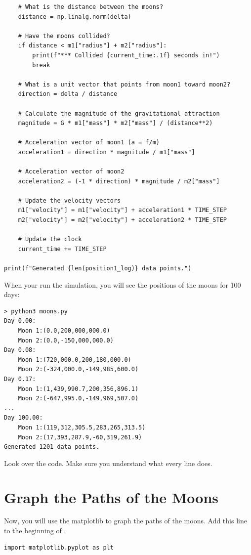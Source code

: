 \begin{verbatim}
    # What is the distance between the moons?
    distance = np.linalg.norm(delta)

    # Have the moons collided?
    if distance < m1["radius"] + m2["radius"]:
        print(f"*** Collided {current_time:.1f} seconds in!")
        break

    # What is a unit vector that points from moon1 toward moon2?
    direction = delta / distance

    # Calculate the magnitude of the gravitational attraction
    magnitude = G * m1["mass"] * m2["mass"] / (distance**2)

    # Acceleration vector of moon1 (a = f/m)
    acceleration1 = direction * magnitude / m1["mass"]

    # Acceleration vector of moon2
    acceleration2 = (-1 * direction) * magnitude / m2["mass"]

    # Update the velocity vectors
    m1["velocity"] = m1["velocity"] + acceleration1 * TIME_STEP
    m2["velocity"] = m2["velocity"] + acceleration2 * TIME_STEP

    # Update the clock
    current_time += TIME_STEP

print(f"Generated {len(position1_log)} data points.")
\end{verbatim}

When your run the simulation,  you will see the positions of the moons for 100 days:
\begin{verbatim}
> python3 moons.py 
Day 0.00:
	Moon 1:(0.0,200,000,000.0)
	Moon 2:(0.0,-150,000,000.0)
Day 0.08:
	Moon 1:(720,000.0,200,180,000.0)
	Moon 2:(-324,000.0,-149,985,600.0)
Day 0.17:
	Moon 1:(1,439,990.7,200,356,896.1)
	Moon 2:(-647,995.0,-149,969,507.0)
...
Day 100.00:
	Moon 1:(119,312,305.5,283,265,313.5)
	Moon 2:(17,393,287.9,-60,319,261.9)
Generated 1201 data points.
\end{verbatim}

Look over the code. Make sure you understand what every line does.

\section{Graph the Paths of the Moons}

Now, you will use the matplotlib to graph the paths of the moons. Add this line to the beginning of 
.

\begin{verbatim}
import matplotlib.pyplot as plt
\end{verbatim}


